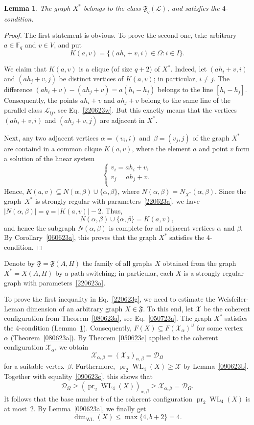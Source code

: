 \documentclass{amsart}
\newcommand{\cal}{\mathcal}
\newtheorem{lemma}[formula]{Lemma}
\def\qtnl#1{\begin{equation}\label{#1}}
\def\eqtn{\end{equation}}
\def\lmml#1{\begin{lemma}\label{#1}}
\def\elmm{\end{lemma}}
\def\prf{\begin{proof}}
\def\eprf{\end{proof}}
\def\cD{{\cal D}}
\def\cL{{\cal L}}
\def\cX{{\cal X}}
\def\mF{{\mathbb F}}
\def\fF{{\mathfrak F}}
\DeclareMathOperator{\pr}{pr}
\DeclareMathOperator{\WL}{WL}
\begin{document}
\lmml{080623j}
The graph $X^*$ belongs to the class $\fF_q(\cL)$, and satisfies the $4$-condition.
\elmm
\prf
The first statement is obvious. To prove the second one, take  arbitrary $a\in \mF_q$ and  $v\in V$, and put
$$
K(a,v)=\{(ah_i+v,i)\in\Omega\colon i\in I\}.
$$

We claim that $K(a,v)$ is a clique (of size $q+2$) of $X^*$. 
Indeed, let $(ah_i+v,i)$ and $(ah_j+v,j)$ be distinct vertices of $K(a,v)$; in particular, $i\ne j$. The difference $(ah_i+v)-(ah_j+v)=a(h_i-h_j)$ belongs to the line $[h_i-h_j]$. 
Consequently, the points $ah_i+v$ and $ah_j+v$ belong to the same  line of the parallel class $\cL_{ij}$, see Eq.~\eqref{220623w}.  But this exactly means that the vertices  $(ah_i+v,i)$ and $(ah_j+v,j)$ are adjacent in $X^*$.

Next, any  two adjacent vertices $\alpha=(v_i,i)$ and~$\beta=(v_j,j)$ of the graph $X^*$ are containd in a common clique $K(a,v)$, where the element $a$ and point $v$ form a solution of the linear system 
$$
\left\{
\begin{aligned}
v_i=ah_i+v,\\
v_j=ah_j+v.\\
\end{aligned}
\right.
$$ 
Hence, $K(a,v)\subseteq N(\alpha,\beta)\cup\{\alpha,\beta\}$, where $N(\alpha,\beta)=N_{X^*}(\alpha,\beta)$. Since the graph~$X^*$ is strongly regular with parameters~\eqref{220623a}, we have $|N(\alpha,\beta) |=q=|K(a,v)|-2$. Thus,
$$
N(\alpha,\beta)\cup\{\alpha,\beta\}=K(a,v),
$$
and hence  the subgraph $N(\alpha,\beta)$ is complete for all adjacent vertices $\alpha$ and $\beta$. By Corollary~\ref{060623a}, this proves that the graph $X^*$ satisfies the $4$-condition.
\eprf

Denote by $\fF=\fF(A,H)$ the family of all graphs $X$ obtained from the graph $X^*=X(A,H)$ by a path switching; in particular, each $X$ is a strongly regular graph with parameters~\eqref {220623a}. 

To prove the first inequality in Eq.~\eqref{220623g}, we need to estimate the Weisfeiler-Leman dimension of an arbitrary graph $X\in\fF$. To this end, let $\cX$  
be the coherent configuration from Theorem~\ref{080623a}, see Eq.~\eqref{050723a}.  The graph $X^*$  satisfies the $4$-condition (Lemma~\ref{080623j}). Consequently, $F(X)\subseteq F(\cX_\alpha)^\cup$  for some vertex~$\alpha$ (Theorem~\ref{080623a}). By Theorem~\ref{050623c} applied to the coherent configuration $\cX_\alpha $, we obtain 
\qtnl{090623c}
\cX_{\alpha,\beta}=(\cX_\alpha)_{\alpha,\beta}=\cD_\Omega
\eqtn
for a suitable vertex~$\beta$. Furthermore, $\pr_2 \WL_4(X)\ge \cX$ 
by Lemma~\ref{090623b}. Together with equality~\eqref{090623c}, 
this shows that
$$
\cD_\Omega\ge (\pr_2 \WL_4(X))_{\alpha,\beta}\ge\cX_{\alpha,\beta}=\cD_\Omega.
$$
It follows that the base number $b$ of the coherent configuration $\pr_2 \WL_4(X)$ is at most~$2$. By Lemma~\ref{090623a}, we finally get 
$$ 
\dim_{\scriptscriptstyle\WL}(X)\le\max\{4,b+2\}=4.
$$
\end{document}
